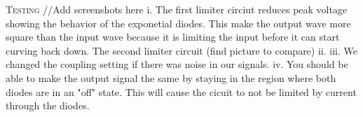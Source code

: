 \documentclass[9pt,a4paper]{report}
\begin{document}
	\textsc{Testing}
	\newline
	//Add screenshots here
	\newline
	\hspace*{.15in}
	i. The first limiter circiut reduces peak voltage showing the behavior of the exponetial diodes. This make the output wave more square than the input wave because it is limiting the input before it can start curving back down. The second limiter circuit (find picture to compare)
	\newline
	\hspace*{.15in} 
	ii.
	\newline
	\hspace*{.15in} 
	iii. We changed the coupling setting if there was noise in our signals.
	\newline
	\hspace*{.15in} 
	iv. You should be able to make the output signal the same by staying in the region where both diodes are in an "off" state. This will cause the cicuit to not be limited by current through the diodes.
	\newline
	
	\vspace*{1.5in}
\end{document}
